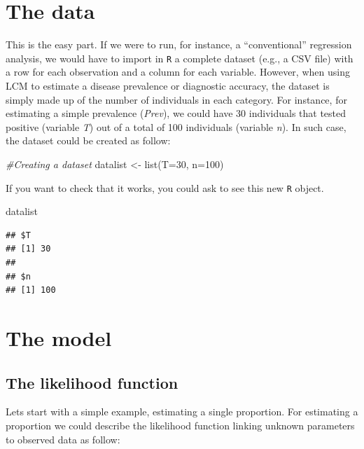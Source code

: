 \documentclass[
]{book}
\newenvironment{Shaded}{\begin{snugshade}}{\end{snugshade}}
\newcommand{\AttributeTok}[1]{\textcolor[rgb]{0.77,0.63,0.00}{#1}}
\newcommand{\CommentTok}[1]{\textcolor[rgb]{0.56,0.35,0.01}{\textit{#1}}}
\newcommand{\DecValTok}[1]{\textcolor[rgb]{0.00,0.00,0.81}{#1}}
\newcommand{\FunctionTok}[1]{\textcolor[rgb]{0.00,0.00,0.00}{#1}}
\newcommand{\NormalTok}[1]{#1}
\newcommand{\OtherTok}[1]{\textcolor[rgb]{0.56,0.35,0.01}{#1}}
\begin{document}
\hypertarget{the-data}{%
\section{The data}\label{the-data}}

This is the easy part. If we were to run, for instance, a
``conventional'' regression analysis, we would have to import in
\texttt{R} a complete dataset (e.g., a CSV file) with a row for each
observation and a column for each variable. However, when using LCM to
estimate a disease prevalence or diagnostic accuracy, the dataset is
simply made up of the number of individuals in each category. For
instance, for estimating a simple prevalence (\emph{Prev}), we could
have 30 individuals that tested positive (variable \emph{T}) out of a
total of 100 individuals (variable \emph{n}). In such case, the dataset
could be created as follow:

\begin{Shaded}
\begin{Highlighting}[]
\CommentTok{\#Creating a dataset}
\NormalTok{datalist }\OtherTok{\textless{}{-}} \FunctionTok{list}\NormalTok{(}\AttributeTok{T=}\DecValTok{30}\NormalTok{, }\AttributeTok{n=}\DecValTok{100}\NormalTok{)}
\end{Highlighting}
\end{Shaded}

If you want to check that it works, you could ask to see this new
\texttt{R} object.

\begin{Shaded}
\begin{Highlighting}[]
\NormalTok{datalist}
\end{Highlighting}
\end{Shaded}

\begin{verbatim}
## $T
## [1] 30
## 
## $n
## [1] 100
\end{verbatim}

\hypertarget{the-model}{%
\section{The model}\label{the-model}}

\hypertarget{the-likelihood-function}{%
\subsection{The likelihood function}\label{the-likelihood-function}}

Lets start with a simple example, estimating a single proportion. For
estimating a proportion we could describe the likelihood function
linking unknown parameters to observed data as follow:
\end{document}
